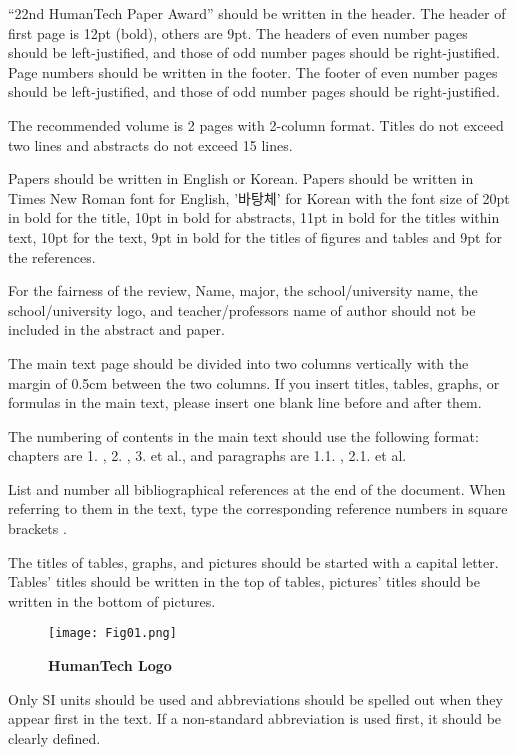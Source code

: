 \documentclass{abstract_hutech}
\begin{document}
``22nd HumanTech Paper Award'' should be written in the header. The header of first page is 12pt (bold), others are 9pt. The headers of even number pages should be left-justified, and those of odd number pages should be right-justified. Page numbers should be written in the footer. The footer of even number pages should be left-justified, and those of odd number pages should be right-justified.

The recommended volume is 2 pages with 2-column format. Titles do not exceed two lines and abstracts do not exceed 15 lines.

Papers should be written in English or Korean. Papers should be written in Times New Roman font for English, '바탕체' for Korean with the font size of 20pt in bold for the title, 10pt in bold for abstracts, 11pt in bold for the titles within text, 10pt for the text, 9pt in bold for the titles of figures and tables and 9pt for the references.

For the fairness of the review, Name, major, the school/university name, the school/university logo, and teacher/professors name of author should not be included in the abstract and paper.

The main text page should be divided into two columns vertically with the margin of 0.5cm between the two columns. If you insert titles, tables, graphs, or formulas in the main text, please insert one blank line before and after them.

The numbering of contents in the main text should use the following format: chapters are 1. , 2. , 3. et al., and paragraphs are 1.1. , 2.1. et al.

List and number all bibliographical references at the end of the document. When referring to them in the text, type the corresponding reference numbers in square brackets \cite{True00}.

The titles of tables, graphs, and pictures should be started with a capital letter. Tables’ titles should be written in the top of tables, pictures’ titles should be written in the bottom of pictures.

\begin{figure}[t]
\begin{center}
\texttt{[image: Fig01.png]}
\end{center}
\caption{\bf HumanTech Logo}\label{Fig01}
\end{figure}

Only SI units should be used and abbreviations should be spelled out when they appear first in the text. If a non-standard abbreviation is used first, it should be clearly defined.
\end{document}
